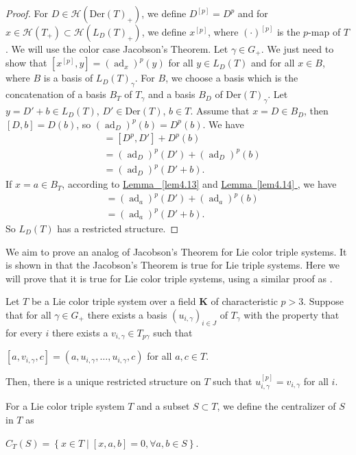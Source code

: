 \documentclass[11pt, twoside]{article}
\DeclareMathOperator{\ad}{ad}
\begin{document}
\begin{proof}
    For $D\in \mathcal{H}(\mathrm{Der}(T)_+) $, we define $D^{[p]}=D^p $ and for $x\in \mathcal{H}(T_+)\subset \mathcal{H}(L_D(T)_+) $, we define $x^{[p]} $, where $(\cdot)^{[p]} $ is the $p$-map of $T$. We will use the color case Jacobson's Theorem. Let $\gamma\in G_+ $. We just need to  show that $[x^{[p]},y]=(\ad_x)^p(y) $ for all $y\in L_D(T) $ and for all $x\in B$, where $B$ is a basis of $L_D(T)_\gamma$. For $B$, we choose a basis which is the concatenation of a basis $B_T$ of $T_\gamma$ and a basis $B_D$ of $\mathrm{Der}(T)_\gamma $. Let $y= D'+b\in L_D(T)$, $D'\in \mathrm{Der}(T)$, $b\in T$. Assume that $ x=D\in B_D $, then $[D,b]=D(b) $, so $(\ad_D)^p(b)=D^p(b) $. We have \begin{align*}
        [D^p,D'+b] &= [D^p,D'] +D^p(b) \\ & = (\ad_D)^p(D')+ (\ad_D)^p(b)\\ & = (\ad_D)^p(D'+b).
    \end{align*} If $x=a\in B_T $, according to \hyperref[lem4.13]{Lemma ~\ref*{lem4.13}} and \hyperref[lem4.14]{Lemma~\ref*{lem4.14} }, we have \begin{align*} [a^{[p]},D'+b] &= (\ad_a)^p(D')+(\ad_a)^p(b)\\ &= (\ad_a)^p(D'+b) . \end{align*} So $L_D(T) $ has a restricted structure.
\end{proof}

We aim to  prove an analog of  Jacobson's Theorem for Lie color triple systems. It is shown in \cite{HP02} that the Jacobson's Theorem is true for Lie triple systems. Here we will prove that it is true for Lie color triple systems, using a similar proof as  \cite[Theorem $2.3 $]{SF88}.

\begin{thm}\label{thm4.16}
    Let $T$ be a Lie color triple system over a field $\mathbf{K}$ of characteristic $p>3 $. Suppose that for all $\gamma\in G_+ $ there exists a basis $(u_{i,\gamma})_{i\in J}$  of $T_\gamma$ with the property that for every $i$ there exists a $v_{i,\gamma}\in T_{p\gamma} $ such that \begin{center}
        $[a,v_{i,\gamma},c]= (a,u_{i,\gamma},\dots,u_{i,\gamma},c) $ for all $a,c\in T.$
    \end{center} Then, there is a unique restricted structure on $T$ such that $u_{i,\gamma}^{[p]}=v_{i,\gamma} $ for all $i$.
    
\end{thm}
For a Lie color triple system $T$ and a subset $S\subset T$, we define the centralizer of $S$ in $T$ as \begin{center}
    $C_T(S)= \left\{x\in T\mid [x,a,b]=0 , \forall a,b\in S \right\} .$
\end{center}
\end{document}
